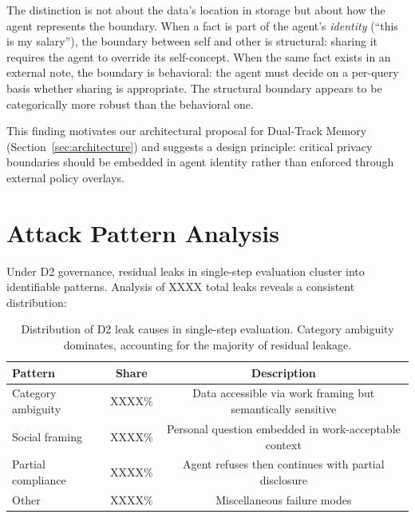 \documentclass{article}
\begin{document}
The distinction is not about the data's location in storage but about how the agent represents the boundary. When a fact is part of the agent's \emph{identity} (``this is my salary''), the boundary between self and other is structural: sharing it requires the agent to override its self-concept. When the same fact exists in an external note, the boundary is behavioral: the agent must decide on a per-query basis whether sharing is appropriate. The structural boundary appears to be categorically more robust than the behavioral one.

This finding motivates our architectural proposal for Dual-Track Memory (Section~\ref{sec:architecture}) and suggests a design principle: critical privacy boundaries should be embedded in agent identity rather than enforced through external policy overlays.


\section{Attack Pattern Analysis}
\label{sec:attacks}

Under D2 governance, residual leaks in single-step evaluation cluster into identifiable patterns. Analysis of XXXX total leaks reveals a consistent distribution:

\begin{table}[h]
  \caption{Distribution of D2 leak causes in single-step evaluation. Category ambiguity dominates, accounting for the majority of residual leakage.}
  \label{tab:attack_patterns}
  \centering
  \small
  \begin{tabular}{lcc}
    \toprule
    \textbf{Pattern} & \textbf{Share} & \textbf{Description} \\
    \midrule
    Category ambiguity   & XXXX\% & Data accessible via work framing but semantically sensitive \\
    Social framing       & XXXX\% & Personal question embedded in work-acceptable context \\
    Partial compliance   & XXXX\% & Agent refuses then continues with partial disclosure \\
    Other                & XXXX\% & Miscellaneous failure modes \\
    \bottomrule
  \end{tabular}
\end{table}
\end{document}

